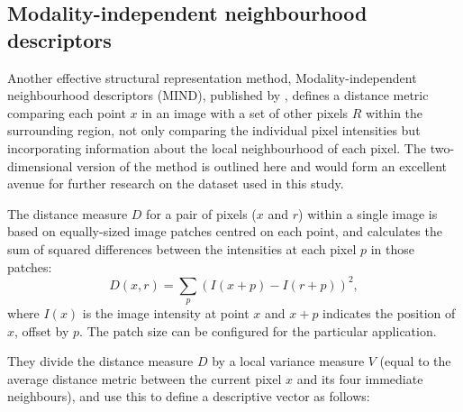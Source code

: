 \documentclass{report}
\begin{document}
\subsection{Modality-independent neighbourhood descriptors}

Another effective structural representation method, Modality-independent neighbourhood descriptors (MIND), published by \cite{heinrich2012mind}, defines a distance metric comparing each point $x$ in an image with a set of other pixels $R$ within the surrounding region, not only comparing the individual pixel intensities but incorporating information about the local neighbourhood of each pixel. The two-dimensional version of the method is outlined here and would form an excellent avenue for further research on the dataset used in this study.
 
The distance measure $D$ for a pair of pixels ($x$ and $r$) within a single image is based on equally-sized image patches centred on each point, and calculates the sum of squared differences between the intensities at each pixel $p$ in those patches:
\[
D(x,r) = \sum_p (I(x+p)-I(r+p))^2,
\]
where $I(x)$ is the image intensity at point $x$ and $x+p$ indicates the position of $x$, offset by $p$. The patch size can be configured for the particular application. 

They divide the distance measure $D$ by a local variance measure $V$ (equal to the average distance metric between the current pixel $x$ and its four immediate neighbours), and use this to define a descriptive vector as follows: 
\end{document}
